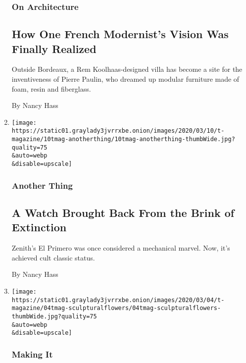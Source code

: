 \begin{enumerate}
  \hypertarget{on-architecture}{%
  \subsubsection{On Architecture}\label{on-architecture}}

  \hypertarget{how-one-french-modernists-vision-was-finally-realized}{%
  \subsection{How One French Modernist's Vision Was Finally
  Realized}\label{how-one-french-modernists-vision-was-finally-realized}}

  Outside Bordeaux, a Rem Koolhaas-designed villa has become a site for
  the inventiveness of Pierre Paulin, who dreamed up modular furniture
  made of foam, resin and fiberglass.

  By Nancy Hass
\item
  \href{/2020/03/10/t-magazine/zenith-el-primero-watch.html}{}

  \texttt{[image: https://static01.graylady3jvrrxbe.onion/images/2020/03/10/t-magazine/10tmag-anotherthing/10tmag-anotherthing-thumbWide.jpg?quality=75\\\&auto=webp\\\&disable=upscale]}

  \hypertarget{another-thing-1}{%
  \subsubsection{Another Thing}\label{another-thing-1}}

  \hypertarget{a-watch-brought-back-from-the-brink-of-extinction}{%
  \subsection{A Watch Brought Back From the Brink of
  Extinction}\label{a-watch-brought-back-from-the-brink-of-extinction}}

  Zenith's El Primero was once considered a mechanical marvel. Now, it's
  achieved cult classic status.

  By Nancy Hass
\item
  \href{/2020/03/04/t-magazine/flower-arrangements-sculptures.html}{}

  \texttt{[image: https://static01.graylady3jvrrxbe.onion/images/2020/03/04/t-magazine/04tmag-sculpturalflowers/04tmag-sculpturalflowers-thumbWide.jpg?quality=75\\\&auto=webp\\\&disable=upscale]}

  \hypertarget{making-it}{%
  \subsubsection{Making It}\label{making-it}}


\end{enumerate}
